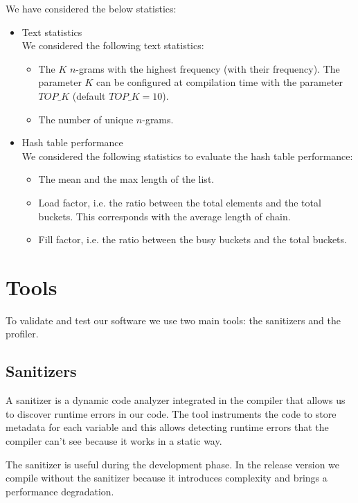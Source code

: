We have considered the below statistics:
\begin{itemize}
    \item Text statistics \\
        We considered the following text statistics:
        \begin{itemize}
            \item The $K$ $n$-grams with the highest frequency (with their frequency). The parameter $K$ can be configured at compilation time with the parameter $TOP\_K$ (default $TOP\_K=10$).
            \item The number of unique $n$-grams.
        \end{itemize}
    \item Hash table performance \\
        We considered the following statistics to evaluate the hash table performance:
        \begin{itemize}
            \item The mean and the max length of the list.
            \item Load factor, i.e. the ratio between the total elements and the total buckets. This corresponds with the average length of chain.
            \item Fill factor, i.e. the ratio between the busy buckets and the total buckets.
        \end{itemize}
\end{itemize}

\section{Tools}
To validate and test our software we use two main tools: the sanitizers and the profiler.

\subsection{Sanitizers}
A sanitizer is a dynamic code analyzer integrated in the compiler that allows us to discover runtime errors in our code. The tool instruments the code to store metadata for each variable and this allows detecting runtime errors that the compiler can't see because it works in a static way.

The sanitizer is useful during the development phase. In the release version we compile without the sanitizer because it introduces complexity and brings a performance degradation.

